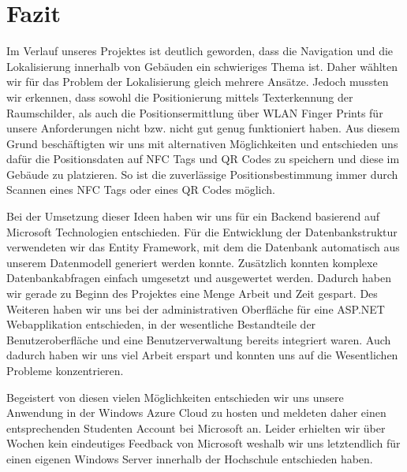 \chapter{Fazit}

Im Verlauf unseres Projektes ist deutlich geworden, dass die Navigation und die Lokalisierung innerhalb von Gebäuden ein schwieriges Thema ist. Daher wählten wir für das Problem der Lokalisierung gleich mehrere Ansätze. Jedoch mussten wir erkennen, dass sowohl die Positionierung mittels Texterkennung der Raumschilder, als auch die Positionsermittlung über WLAN Finger Prints für unsere Anforderungen nicht bzw. nicht gut genug funktioniert haben.
Aus diesem Grund beschäftigten wir uns mit alternativen Möglichkeiten und entschieden uns dafür die Positionsdaten auf NFC Tags und QR Codes zu speichern und diese im Gebäude zu platzieren. So ist die zuverlässige Positionsbestimmung immer durch Scannen eines NFC Tags oder eines QR Codes möglich.

Bei der Umsetzung dieser Ideen haben wir uns für ein Backend basierend auf Microsoft Technologien entschieden. Für die Entwicklung der Datenbankstruktur verwendeten wir das Entity Framework, mit dem die Datenbank automatisch aus unserem Datenmodell generiert werden konnte. Zusätzlich konnten komplexe Datenbankabfragen einfach umgesetzt und ausgewertet werden. Dadurch haben wir gerade zu Beginn des Projektes eine Menge Arbeit und Zeit gespart. Des Weiteren haben wir uns bei der administrativen Oberfläche für eine ASP.NET Webapplikation entschieden, in der wesentliche Bestandteile der Benutzeroberfläche und eine Benutzerverwaltung bereits integriert waren. Auch dadurch haben wir uns viel Arbeit erspart und konnten uns auf die Wesentlichen Probleme konzentrieren.

Begeistert von diesen vielen Möglichkeiten entschieden wir uns unsere Anwendung in der Windows Azure Cloud zu hosten und meldeten daher einen entsprechenden Studenten Account bei Microsoft an. Leider erhielten wir über Wochen kein eindeutiges Feedback von Microsoft weshalb wir uns letztendlich für einen eigenen Windows Server innerhalb der Hochschule entschieden haben.

